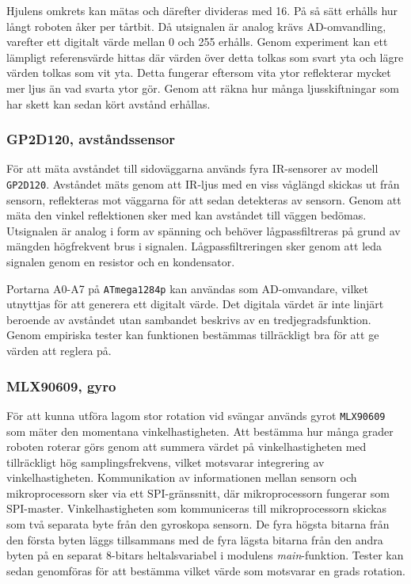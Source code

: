 \documentclass[11pt]{article}
\begin{document}
\begin{flushleft}
Hjulens omkrets kan mätas och därefter divideras med 16. På så sätt erhålls hur långt roboten åker per tårtbit.
Då utsignalen är analog krävs AD-omvandling, varefter ett digitalt värde mellan 0 och 255 erhålls. Genom experiment kan ett lämpligt referensvärde hittas där värden över detta tolkas som svart yta och lägre värden tolkas som vit yta. Detta fungerar eftersom vita ytor reflekterar mycket mer ljus än vad svarta ytor gör. Genom att räkna hur många ljusskiftningar som har skett kan sedan kört avstånd erhållas.

\subsubsection{GP2D120, avståndssensor}
För att mäta avståndet till sidoväggarna används fyra IR-sensorer av modell \verb+GP2D120+. Avståndet mäts genom att IR-ljus med en viss våglängd skickas ut från sensorn, reflekteras mot väggarna för att sedan detekteras av sensorn. Genom att mäta den vinkel reflektionen sker med kan avståndet till väggen bedömas. Utsignalen är analog i form av spänning och behöver lågpassfiltreras på grund av mängden högfrekvent brus i signalen. Lågpassfiltreringen sker genom att leda signalen genom en resistor och en kondensator.

Portarna A0-A7 på \verb+ATmega1284p+ kan användas som AD-omvandare, vilket utnyttjas för att generera ett digitalt värde. Det digitala värdet är inte linjärt beroende av avståndet utan sambandet beskrivs av en tredjegradsfunktion. Genom empiriska tester kan funktionen bestämmas tillräckligt bra för att ge värden att reglera på.

\subsubsection{MLX90609, gyro}
För att kunna utföra lagom stor rotation vid svängar används gyrot \verb+MLX90609+ som mäter den momentana vinkelhastigheten. Att bestämma hur många grader roboten roterar görs genom att summera värdet på vinkelhastigheten med tillräckligt hög samplingsfrekvens, vilket motsvarar integrering av vinkelhastigheten. Kommunikation av informationen mellan sensorn och mikroprocessorn sker via ett SPI-gränssnitt, där mikroprocessorn fungerar som SPI-master. Vinkelhastigheten som kommuniceras till mikroprocessorn skickas som två separata byte från den gyroskopa sensorn. De fyra högsta bitarna från den första byten läggs tillsammans med de fyra lägsta bitarna från den andra byten på en separat 8-bitars heltalsvariabel i modulens \textit{main}-funktion. Tester kan sedan genomföras för att bestämma vilket värde som motsvarar en grads rotation.  


\end{flushleft}
\end{document}

